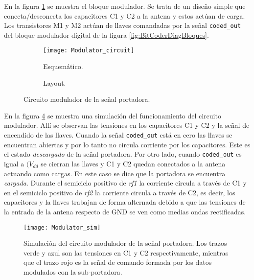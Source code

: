 En la figura \ref{fig:ModulatorCircuit} se muestra el bloque 
modulador. Se trata de un diseño simple que conecta/desconecta los 
capacitores C1 y C2 a la antena y estos actúan de carga. Los 
transistores M1 y M2 actúan de llaves comandadas por la señal 
\lstinline{coded_out} del bloque modulador digital de la figura 
\ref{fig:BitCoderDiagBloques}.

\begin{figure}
	\centering
	\begin{subfigure}[b]{0.4\textwidth}
		\centering
		\texttt{[image: Modulator\_circuit]}
		\caption{Esquemático.}
		\label{fig:ModulatorCircuit}
	\end{subfigure}
	\quad
    \begin{subfigure}[b]{0.4\textwidth}
	    \centering
		\caption{Layout.}
		\label{fig:ModulatorLayout}
	\end{subfigure}
	\caption{Circuito modulador de la señal portadora.}
	\label{fig:ModulatorCircuitLayout}
\end{figure}

En la figura \ref{fig:ModulatorCircuitSim} se muestra una simulación 
del funcionamiento del circuito modulador. Allí se observan las 
tensiones en los capacitores C1 y C2 y la señal de encendido de las 
llaves. Cuando la señal \lstinline{coded_out} está en cero las llaves se 
encuentran abiertas y por lo tanto no circula corriente por los 
capacitores. Este es el estado \emph{descargado} de la señal 
portadora. Por otro lado, cuando \lstinline{coded_out} es igual a 
\((V_{dd}\) se cierran las llaves y C1 y C2 quedan conectados a la 
antena actuando como cargas. En este caso se dice que la portadora se 
encuentra \emph{cargada}. Durante el semiciclo positivo 
de \emph{rf1} la corriente circula a través de C1 y en el 
semiciclo positivo de \emph{rf2} la corriente circula a través de 
C2, es decir, los capacitores y la llaves trabajan de forma 
alternada debido a que las tensiones de la entrada de la antena 
respecto de GND se ven como medias ondas rectificadas. 

\begin{figure}
	\centering
	\texttt{[image: Modulator\_sim]}
	\caption{Simulación del circuito modulador de la señal portadora. 
	Los trazos verde y azul son las tensiones en C1 y C2 
	respectivamente, mientras que el trazo rojo es la señal de comando 
	formada por los datos modulados con la sub-portadora.}
	\label{fig:ModulatorCircuitSim}
\end{figure}

